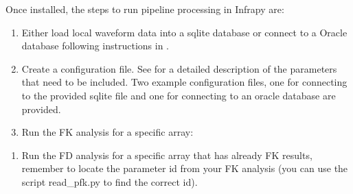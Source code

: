 \documentclass[letterpaper,10pt,english]{sphinxmanual}
\begin{document}
Once installed, the steps to run pipeline processing in Infrapy are:
\begin{enumerate}
%
\item {} 
Either load local waveform data into a sqlite database or connect to a Oracle database following instructions in {\hyperref[\detokenize{pisces:pisces}]{}}.

\item {} 
Create a configuration file. See {\hyperref[\detokenize{config:config}]{}} for a detailed description of the parameters that need to be included. Two example configuration files, one for connecting to the provided sqlite file and one for connecting to an oracle database are provided.

\item {} 
Run the FK analysis for a specific array:

\end{enumerate}

\begin{sphinxVerbatim}[commandchars=\\\{\}]
    
\end{sphinxVerbatim}
\begin{enumerate}
%
\setcounter{enumi}{3}
\item {} 
Run the FD analysis for a specific array that has already FK results, remember to locate the parameter id from your FK analysis (you can use the script read\_pfk.py to find the correct id).

\end{enumerate}

\begin{sphinxVerbatim}[commandchars=\\\{\}]
      

           

  

        
\end{sphinxVerbatim}
\end{document}
